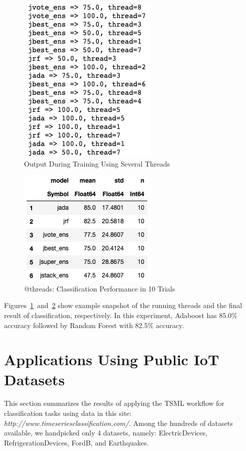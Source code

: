 \documentclass{juliacon}
\begin{document}
\begin{figure}[htbp]
   \centering
   \includegraphics[width=0.5\columnwidth]{threadrunning.png} %
   \caption{Output During Training Using Several Threads}
   \label{fig:threadrunning}
\end{figure}

\begin{figure}[htbp]
   \centering
   \includegraphics[width=0.5\columnwidth]{threadresult.png} %
   \caption{@threads: Classification Performance in 10 Trials}
   \label{fig:threadresult}
\end{figure}

Figures~\ref{fig:threadrunning}~and~\ref{fig:threadresult} show example snapshot of the running threads and the final result of classification, respectively. In this experiment, Adaboost has 85.0\% accuracy followed by Random Forest with 82.5\% accuracy.

\section{Applications Using Public IoT Datasets}

This section summarizes the results of applying the TSML workflow for classification tasks using data in this site: 
\emph{http://www.timeseriesclassification.com/}. Among the hundreds of datasets available, we handpicked 
only 4 datasets, namely: ElectricDevices, RefrigerationDevices, FordB, and Earthquakes. 
\end{document}
